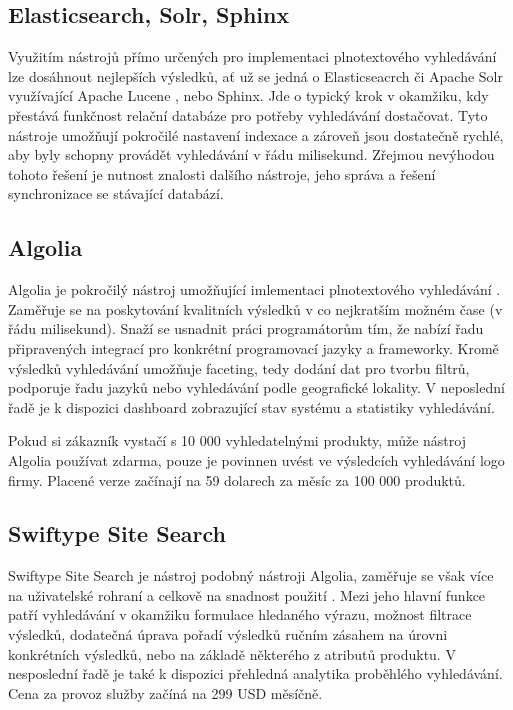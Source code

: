 \documentclass[FM,DP]{tulthesis}
\begin{document}
\subsection*{Elasticsearch, Solr, Sphinx}

Využitím nástrojů přímo určených pro implementaci plnotextového vyhledávání lze 
dosáhnout nejlepších výsledků, ať už se jedná o Elasticseacrch či Apache Solr využívající
Apache Lucene \cite{lucene}, nebo Sphinx. Jde o typický krok v okamžiku, kdy
přestává funkčnost relační databáze pro potřeby vyhledávání dostačovat. Tyto nástroje
umožňují pokročilé nastavení indexace a zároveň jsou dostatečně rychlé, aby byly
schopny provádět vyhledávání v řádu milisekund. Zřejmou nevýhodou tohoto řešení
je nutnost znalosti dalšího nástroje, jeho správa a řešení synchronizace se 
stávající databází.

\subsection*{Algolia}

Algolia je pokročilý nástroj umožňující imlementaci plnotextového vyhledávání \cite{algolia}. 
Zaměřuje se na poskytování kvalitních výsledků v co nejkratším možném čase (v řádu milisekund). 
Snaží se usnadnit práci programátorům tím, že nabízí řadu připravených integrací 
pro konkrétní programovací jazyky a frameworky. Kromě výsledků vyhledávání umožňuje 
faceting, tedy dodání dat pro tvorbu filtrů, podporuje řadu jazyků nebo vyhledávání 
podle geografické lokality. V neposlední řadě je k dispozici dashboard zobrazující 
stav systému a statistiky vyhledávání.

Pokud si zákazník vystačí s 10 000 vyhledatelnými produkty, může nástroj Algolia používat
zdarma, pouze je povinnen uvést ve výsledcích vyhledávání logo firmy. Placené verze 
začínají na 59 dolarech za měsíc za 100 000 produktů.

\subsection*{Swiftype Site Search}

Swiftype Site Search je nástroj podobný nástroji Algolia, zaměřuje se však více na 
uživatelské rohraní a celkově na snadnost použití \cite{swiftype}. Mezi jeho hlavní
funkce patří vyhledávání v okamžiku formulace hledaného výrazu, možnost filtrace
výsledků, dodatečná úprava pořadí výsledků ručním zásahem na úrovni konkrétních 
výsledků, nebo na základě některého z atributů produktu. V nesposlední řadě je také
k dispozici přehledná analytika proběhlého vyhledávání. Cena za provoz služby
začíná na 299 USD měsíčně.
\end{document}
